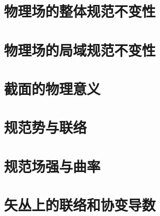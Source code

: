 \section{物理场的整体规范不变性}

\section{物理场的局域规范不变性}

\section{截面的物理意义}

\section{规范势与联络}

\section{规范场强与曲率}

\section{矢丛上的联络和协变导数}

